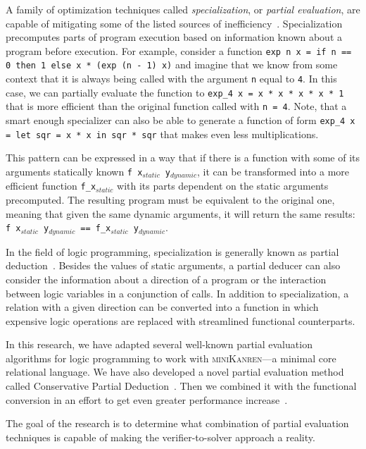 A family of optimization techniques called \emph{specialization}, or \emph{partial evaluation}, are capable of mitigating some of the listed sources of inefficiency~\cite{de1999conjunctive,verbitskaia2021empirical}. 
Specialization precomputes parts of program execution based on information known about a program before execution. 
For example, consider a function \texttt{exp n x = if n == 0 then 1 else x * (exp (n - 1) x)} and imagine that we know from some context that it is always being called with the argument \texttt{n} equal to  \texttt{4}. 
In this case, we can partially evaluate the function to \texttt{exp\_4 x = x * x * x * x * 1} that is more efficient than the original function called with \texttt{n = 4}. 
Note, that a smart enough specializer can also be able to generate a function of form \texttt{exp\_4 x = let sqr = x * x in sqr * sqr} that makes even less multiplications. 

This pattern can be expressed in a way that if there is a function with some of its arguments statically known \texttt{f x$_{static}$ y$_{dynamic}$}, it can be transformed into a more efficient function \texttt{f\_x$_{static}$} with its parts dependent on the static arguments precomputed.
The resulting program must be equivalent to the original one, meaning that given the same dynamic arguments, it will return the same results: \texttt{f x$_{static}$ y$_{dynamic}$ == f\_x$_{static}$ y$_{dynamic}$}.

In the field of logic programming, specialization is generally known as partial deduction~\cite{komorowski1992introduction}. 
Besides the values of static arguments, a partial deducer can also consider the information about a direction of a program or the interaction between logic variables in a conjunction of calls. 
In addition to specialization, a relation with a given direction can be converted into a function in which expensive logic operations are replaced with streamlined functional counterparts. 


In this research, we have adapted several well-known partial evaluation algorithms for logic programming to work with \textsc{miniKanren}---a minimal core relational language. 
We have also developed a novel partial evaluation method called Conservative Partial Deduction~\cite{verbitskaia2021empirical}.
Then we combined it with the functional conversion in an effort to get even greater performance increase~\cite{verbitskaia2024case}. 

The goal of the research is to determine what combination of partial evaluation techniques is capable of making the verifier-to-solver approach a reality. 






